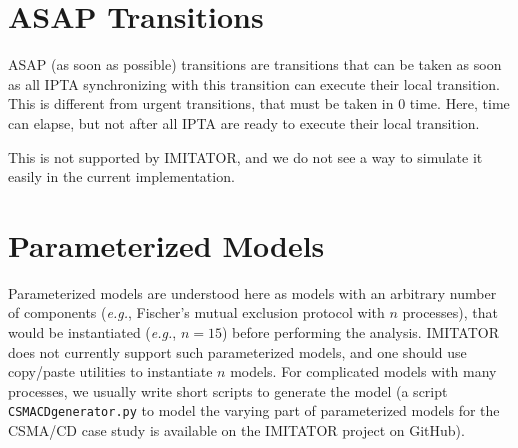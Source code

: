 \documentclass[a4paper,11pt]{report}
\makeatletter
\newcommand{\imitator}{\textsf{IMITATOR}}
\newcommand{\IPTA}{IPTA}
\newcommand{\styleIMI}[1]{\textcolor{imicolor}{\texttt{#1}}}
\newcommand{\stylePath}[1]{\textcolor{pathcolor}{\texttt{#1}}}
\newcommand{\GitHubIMI}{GitHub} %
\newcommand{\eg}{\textcolor{colorok}{\textit{e.g.},\@}}
\newcommand{\ie}{\textcolor{colorok}{\textit{i.e.},\@}}
\makeatother
\begin{document}
% 




\section{ASAP Transitions}

ASAP (as soon as possible) transitions are transitions that can be taken as soon as all \IPTA{} synchronizing with this transition can execute their local transition.
This is different from urgent transitions, that must be taken in 0 time.
Here, time can elapse, but not after all \IPTA{} are ready to execute their local transition.

This is not supported by \imitator{}, and we do not see a way to simulate it easily in the current implementation.



\section{Parameterized Models}

Parameterized models are understood here as models with an arbitrary number of components (\eg{} Fischer's mutual exclusion protocol with $n$ processes), that would be instantiated (\eg{} $n = 15$) before performing the analysis.
\imitator{} does not currently support such parameterized models, and one should use copy/paste utilities to instantiate $n$ models.
For complicated models with many processes, we usually write short scripts to generate the model (a script \stylePath{CSMACDgenerator.py} to model the varying part of parameterized models for the CSMA/CD case study is available on the \imitator{} project on \GitHubIMI{}).
\end{document}
